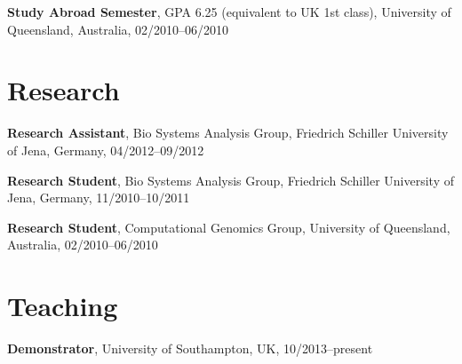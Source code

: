 \documentclass[margin,line]{res}
\newenvironment{list1}{
  \begin{list}{\ding{113}}{%
      \setlength{\itemsep}{0in}
      \setlength{\parsep}{0in} \setlength{\parskip}{0in}
      \setlength{\topsep}{0in} \setlength{\partopsep}{0in} 
      \setlength{\leftmargin}{0.17in}}}{\end{list}}
\begin{document}
\begin{resume}
{\bf Study Abroad Semester}, GPA 6.25 (equivalent to UK 1st class), University of Queensland, Australia, 02/2010--06/2010\\
\vspace*{-.2in}


\section{\sc Research}

{\bf Research Assistant}, Bio Systems Analysis Group, Friedrich Schiller University of Jena, Germany, 04/2012--09/2012\\
\vspace*{-.1in}
\vspace*{-.1in}

{\bf Research Student}, Bio Systems Analysis Group, Friedrich Schiller University of Jena, Germany, 11/2010--10/2011\\
\vspace*{-.1in}
\vspace*{-.1in}

{\bf Research Student}, Computational Genomics Group, University of Queensland, Australia, 02/2010--06/2010\\
\vspace*{-.1in}
\vspace*{-.2in}


\section{\sc Teaching}
{\bf Demonstrator}, University of Southampton, UK, 10/2013--present\\
\vspace*{-.1in}
\vspace*{-.1in}


\end{resume}
\end{document}
